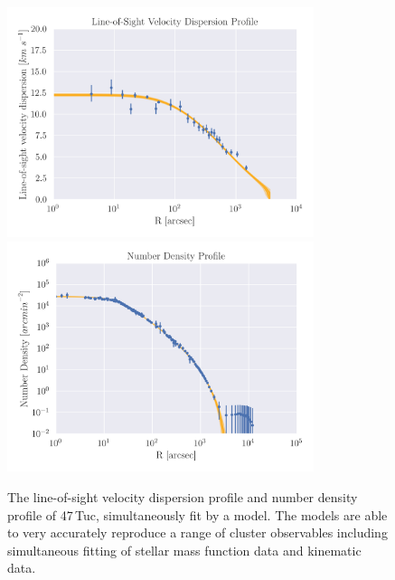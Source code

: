 \begin{figure}
	\centering
	\includegraphics[width=0.8\textwidth]{./figures/limepy_veldisp.png}
	\includegraphics[width=0.8\textwidth]{./figures/limepy_numdens.png}
	\caption{The line-of-sight velocity dispersion profile and number density profile of
		47\,Tuc, simultaneously fit by a  model. The  models are
		able to very accurately reproduce a range of cluster observables including
		simultaneous fitting of stellar mass function data and kinematic data.}
	\label{fig:1/limepy_models}
\end{figure}



